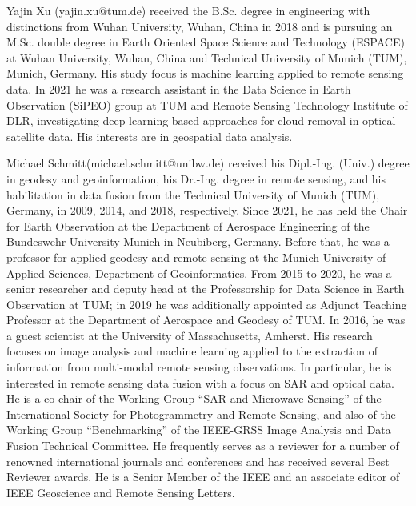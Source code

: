 \documentclass[journal]{IEEEtran}
\begin{document}
\begin{IEEEbiography}{Yajin Xu} (yajin.xu@tum.de) received the B.Sc. degree in engineering with distinctions from Wuhan University, Wuhan, China in 2018 and is pursuing an M.Sc. double degree in Earth Oriented Space Science and Technology (ESPACE) at Wuhan University, Wuhan, China and Technical University of Munich (TUM), Munich, Germany. His study focus is machine learning applied to remote sensing data. In 2021 he was a research assistant in the Data Science in Earth Observation (SiPEO) group at TUM and Remote Sensing Technology Institute of DLR, investigating deep learning-based approaches for cloud removal in optical satellite data. His interests are in geospatial data analysis. \end{IEEEbiography}

\begin{IEEEbiography}{Michael Schmitt}(michael.schmitt@unibw.de) received his Dipl.-Ing. (Univ.) degree in geodesy and geoinformation, his Dr.-Ing. degree in remote sensing, and his habilitation in data fusion from the Technical University of Munich (TUM), Germany, in 2009, 2014, and 2018, respectively.
Since 2021, he has held the Chair for Earth Observation at the Department of Aerospace Engineering of the Bundeswehr University Munich in Neubiberg, Germany. Before that, he was a professor for applied geodesy and remote sensing at the Munich University of Applied Sciences, Department of Geoinformatics. From 2015 to 2020, he was a senior researcher and deputy head at the Professorship for Data Science in Earth Observation at TUM; in 2019 he was additionally appointed as Adjunct Teaching Professor at the Department of Aerospace and Geodesy of TUM. In 2016, he was a guest scientist at the University of Massachusetts, Amherst. His research focuses on image analysis and machine learning applied to the extraction of information from multi-modal remote sensing observations. In particular, he is interested in remote sensing data fusion with a focus on SAR and optical data. He is a co-chair of the Working Group ``SAR and Microwave Sensing'' of the International Society for Photogrammetry and Remote Sensing, and also of the Working Group ``Benchmarking'' of the IEEE-GRSS Image Analysis and Data Fusion Technical Committee. He frequently serves as a reviewer for a number of renowned international journals and conferences and has received several Best Reviewer awards. He is a Senior Member of the IEEE and an associate editor of IEEE Geoscience and Remote Sensing Letters.
\end{IEEEbiography}
\end{document}
